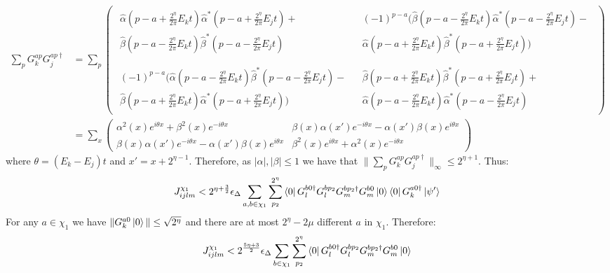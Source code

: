 \documentclass[aps,floatfix,10pt,amssymb,amsfont,amsmath,superscriptaddress,float,nofootinbib,longbibliography,nobalancelastpage,twocolumn]{revtex4-2}
\begin{document}
\begin{align}
    \sum_{p}G_k^{ap}G_j^{ap\dagger} &=\sum_{p}\begin{pmatrix}
        \substack{\hat\alpha(p-a+\frac{2^{\eta}}{2\pi}E_kt)\hat\alpha^*(p-a+\frac{2^{\eta}}{2\pi}E_jt) +\\ \hat\beta(p-a-\frac{2^{\eta}}{2\pi}E_kt)\hat\beta^*(p-a-\frac{2^{\eta}}{2\pi}E_jt)} & \substack{(-1)^{p-a}(\hat\beta(p-a-\frac{2^{\eta}}{2\pi}E_kt)\hat\alpha^*(p-a-\frac{2^{\eta}}{2\pi}E_jt)-\\\hat\alpha(p-a+\frac{2^{\eta}}{2\pi}E_kt)\hat\beta^* (p-a+\frac{2^{\eta}}{2\pi}E_jt))}\\\\
        \substack{(-1)^{p-a}(\hat\alpha(p-a-\frac{2^{\eta}}{2\pi}E_kt)\hat\beta^*(p-a-\frac{2^{\eta}}{2\pi}E_jt)-\\\hat\beta (p-a+\frac{2^{\eta}}{2\pi}E_kt)\hat\alpha^*(p-a+\frac{2^{\eta}}{2\pi}E_jt))} & \substack{\hat\beta (p-a+\frac{2^{\eta}}{2\pi}E_kt)\hat\beta^* (p-a+\frac{2^{\eta}}{2\pi}E_jt) +
        \\\hat\alpha(p-a-\frac{2^{\eta}}{2\pi}E_kt)\hat\alpha^*(p-a-\frac{2^{\eta}}{2\pi}E_jt)}
    \end{pmatrix}\\
    &= \sum_x \begin{pmatrix}\alpha^2(x)e^{i\theta x} + \beta^2(x)e^{-i\theta x} & \beta(x)\alpha(x')e^{-i\theta x} - \alpha(x')\beta(x)e^{i\theta x}\\
    \beta(x)\alpha(x')e^{-i\theta x} - \alpha(x')\beta(x)e^{i\theta x} & \beta^2(x)e^{i\theta x} + \alpha^2(x)e^{-i\theta x}
    \end{pmatrix}
\end{align}
where $\theta = (E_k - E_j)t$ and $x' = x+2^{\eta-1}$. Therefore, as $|\alpha|, |\beta| \leq 1$ we have that $\|\sum_{p}G_k^{ap}G_j^{ap\dagger}\|_{\infty} \leq 2^{\eta+1}$. Thus:
\begin{equation}
    J_{ijlm}^{\chi_1} < 2^{\eta+\frac{3}{2}}\epsilon_{\Delta} \sum_{a,b\in \chi_1} \sum_{p_2}^{2^{\eta}}\bra{0} G^{b0\dagger}_lG^{bp_2}_lG^{bp_2\dagger}_mG^{b0}_m\ket{0}
    \bra{0}G_k^{a0\dagger}\ket{\psi'} 
\end{equation}
For any $a \in \chi_1$ we have $\|G_k^{a0}\ket{0}\| \leq \sqrt{2^{\eta}}$ and there are at most $2^{\eta} - 2\mu$ different $a$ in $\chi_1$. Therefore:
\begin{equation}
    J_{ijlm}^{\chi_1} < 2^{\frac{5 \eta + 3}{2}}\epsilon_{\Delta} \sum_{b \in \chi_1} \sum_{p_2}^{2^{\eta}}\bra{0} G^{b0\dagger}_lG^{bp_2}_lG^{bp_2\dagger}_mG^{b0}_m\ket{0}
\end{equation}
\end{document}
